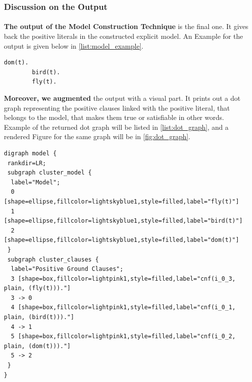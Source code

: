 		
	

	\subsubsection{Discussion on the Output}
		\paragraph{}		
		\textbf{The output of the Model Construction Technique} is the final one. It gives back the positive literals in the constructed explicit model. An Example for the output is given below in \ref{list:model_example}.
		
		
			\begin{minipage}{\textwidth}
			\begin{lstlisting}[caption=Example for the returned Model,label={list:model_example},frame=single]
		dom(t).
		bird(t).
		fly(t).
			\end{lstlisting} 
			\end{minipage}						
		
		
		\textbf{Moreover, we augmented} the output with a visual part. It prints out a dot graph representing the positive clauses linked with the positive literal, that belongs to the model, that makes them true or satisfiable in other words. Example of the returned dot graph will be listed in \ref{list:dot_graph}, and a rendered Figure for the same graph will be in \ref{fig:dot_graph}.
		
			\begin{minipage}{\textwidth}
			\begin{lstlisting}[caption=Example of returned dot graph,label={list:dot_graph},breaklines=true,frame=single]
digraph model {
 rankdir=LR;
 subgraph cluster_model {
  label="Model"; 
  0 [shape=ellipse,fillcolor=lightskyblue1,style=filled,label="fly(t)"]
  1 [shape=ellipse,fillcolor=lightskyblue1,style=filled,label="bird(t)"]
  2 [shape=ellipse,fillcolor=lightskyblue1,style=filled,label="dom(t)"]
 }
 subgraph cluster_clauses {
  label="Positive Ground Clauses"; 
  3 [shape=box,fillcolor=lightpink1,style=filled,label="cnf(i_0_3, plain, (fly(t)))."]
  3 -> 0
  4 [shape=box,fillcolor=lightpink1,style=filled,label="cnf(i_0_1, plain, (bird(t)))."]
  4 -> 1
  5 [shape=box,fillcolor=lightpink1,style=filled,label="cnf(i_0_2, plain, (dom(t)))."]
  5 -> 2
 }
}
			\end{lstlisting} 
			\end{minipage}						

